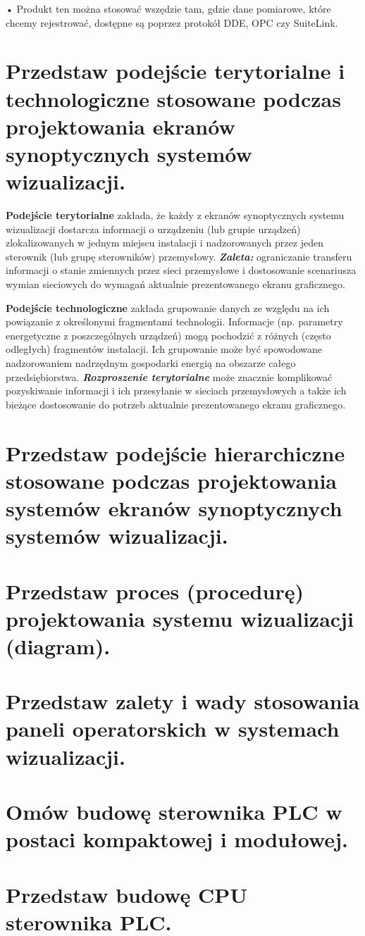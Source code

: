 \documentclass{article}
\begin{document}
	• Produkt ten można stosować wszędzie tam, gdzie dane pomiarowe,
	które chcemy rejestrować, dostępne są poprzez protokół DDE, OPC czy
	SuiteLink.
	
	\section{Przedstaw podejście terytorialne i technologiczne stosowane podczas projektowania	ekranów synoptycznych systemów wizualizacji.}
\textbf{	Podejście terytorialne} zakłada, że każdy z ekranów
	synoptycznych systemu wizualizacji dostarcza informacji o
	urządzeniu (lub grupie urządzeń) zlokalizowanych w jednym miejscu
	instalacji i nadzorowanych przez jeden sterownik (lub grupę
	sterowników) przemysłowy.
	\textit{\textbf{Zaleta:}} ograniczanie transferu informacji o stanie zmiennych przez
	sieci przemysłowe i dostosowanie scenariusza wymian sieciowych do
	wymagań aktualnie prezentowanego ekranu graficznego.
	
	
	\textbf{Podejście technologiczne }zakłada grupowanie danych ze względu na
	ich powiązanie z określonymi fragmentami technologii. Informacje (np.
	parametry energetyczne z poszczególnych urządzeń) mogą pochodzić z
	różnych (często odległych) fragmentów instalacji. Ich grupowanie może być
	spowodowane nadzorowaniem nadrzędnym gospodarki energią na obszarze
	całego przedsiębiorstwa.
	\textbf{\textit{Rozproszenie terytorialne }}może znacznie komplikować pozyskiwanie
	informacji i ich przesyłanie w sieciach przemysłowych a także ich bieżące
	dostosowanie do potrzeb aktualnie prezentowanego ekranu graficznego.
	
	\section{Przedstaw podejście hierarchiczne stosowane podczas projektowania systemów	ekranów synoptycznych systemów wizualizacji.}
	
	
	\section{Przedstaw proces (procedurę) projektowania systemu wizualizacji (diagram).}
	\section{ Przedstaw zalety i wady stosowania paneli operatorskich w systemach wizualizacji.}
	\section{ Omów budowę sterownika PLC w postaci kompaktowej i modułowej.}
	\section{ Przedstaw budowę CPU sterownika PLC.}
	
\label{LastPage}
\end{document}
